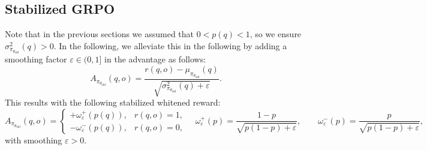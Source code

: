 \documentclass[11pt,reqno]{amsart}
\begin{document}




\subsection{Stabilized GRPO } Note that in the previous sections we assumed that $0<p(q)<1$, so we ensure $\sigma^2_{\pi_{\theta_{\text{old}}}}(q)>0$. In the following, we alleviate this in the following by adding a smoothing factor $\varepsilon \in (0,1]$ in the advantage as follows:
 $$A_{\pi_{\theta_{\text{old}}}}(q,o)= \frac{r(q,o) -\mu_{\pi_{\theta_{\text{old}}}}(q)}{\sqrt{\sigma^2_{\pi_{\theta_{\text{old}}}}(q)+\varepsilon}}.$$
 This results with the following stabilized whitened reward: 
\begin{equation}
\label{eq:casesmeanvar}
A_{\pi_{\theta_{\text{old}}}}(q,o)=
\begin{cases}
+\omega^+_{\varepsilon}(p(q)), & r(q,o)=1,\\
-\omega^-_{\varepsilon}(p(q)), & r(q,o)=0,
\end{cases}
\quad
\omega^+_{\varepsilon}(p)=\frac{1-p}{\sqrt{p(1-p)+\varepsilon}},
\qquad
\omega^-_{\varepsilon}(p)=\frac{p}{\sqrt{p(1-p)+\varepsilon}},
\end{equation}
with smoothing $\varepsilon>0$. 
\end{document}
